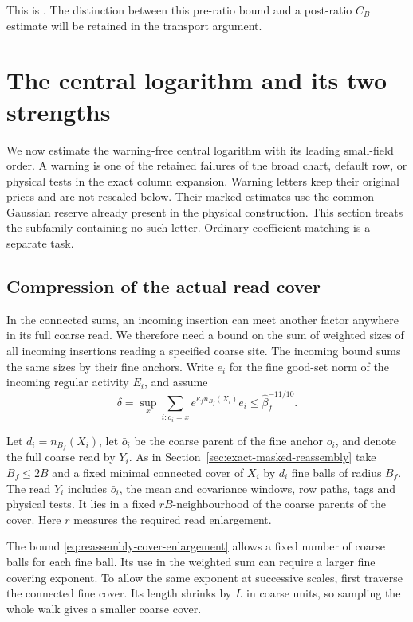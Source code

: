 \documentclass[11pt,reqno]{amsart}
\numberwithin{equation}{section}
\theoremstyle{definition}
\theoremstyle{remark}
\begin{document}
This is \cite[Lemma~35.4, p.~216]{Main}. The distinction
between this pre-ratio bound and a post-ratio \(C_B\) estimate
will be retained in the transport argument.

\section{The central logarithm and its two strengths}
\label{sec:central-strength-estimates}

We now estimate the warning-free central logarithm with its
leading small-field order. A warning is one of the retained
failures of the broad chart, default row, or physical tests in
the exact column expansion. Warning letters keep their original
prices and are not rescaled below. Their marked estimates use
the common Gaussian reserve already present in the physical
construction. This section treats the subfamily containing no
such letter. Ordinary coefficient matching is a separate task.

\subsection{Compression of the actual read cover}

In the connected sums, an incoming insertion can meet another
factor anywhere in its full coarse read. We therefore need a
bound on the sum of weighted sizes of all incoming insertions
reading a specified coarse site. The incoming bound sums the
same sizes by their fine anchors.
Write \(e_i\) for the fine good-set norm of the incoming
regular activity \(E_i\), and assume
\begin{equation}
 \delta=\sup_x\sum_{i:o_i=x}e^{\kappa_f n_{B_f}(X_i)}e_i
                       \le\widehat\beta_f^{-11/10}.
 \label{eq:central-incoming-family}
\end{equation}

Let \(d_i=n_{B_f}(X_i)\), let \(\bar o_i\) be the coarse
parent of the fine anchor \(o_i\), and denote the full coarse
read by \(Y_i\). As in Section~\ref{sec:exact-masked-reassembly}
take \(B_f\le2B\) and a fixed minimal connected cover of
\(X_i\) by \(d_i\) fine balls of radius \(B_f\).
The read \(Y_i\) includes \(\bar o_i\), the mean and covariance
windows, row paths, tags and physical tests. It lies in a
fixed \(rB\)-neighbourhood of the coarse parents of the
cover. Here \(r\) measures the required read enlargement.

The bound \eqref{eq:reassembly-cover-enlargement}
allows a fixed number of coarse balls for each fine ball.
Its use in the weighted sum can require a larger fine
covering exponent. To allow the same exponent at successive
scales, first traverse the connected fine cover. Its
length shrinks by \(L\) in coarse units, so sampling
the whole walk gives a smaller coarse cover.
\end{document}
